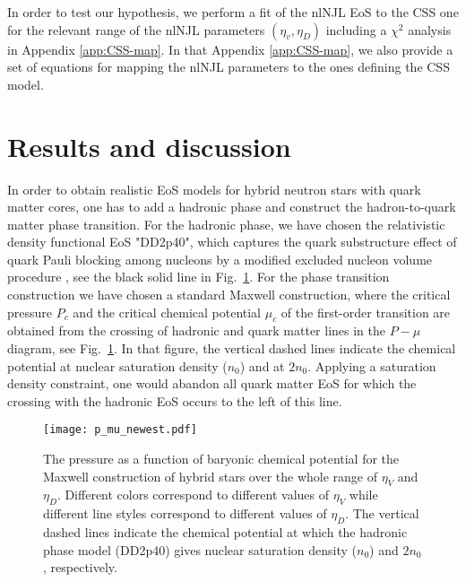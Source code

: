 \documentclass[%
 reprint,
superscriptaddress,
nofootinbib,
 amsmath,amssymb,
 aps,
]{revtex4-1}
\begin{document}
In order to test our hypothesis, we perform a fit of the nlNJL EoS to the CSS one for the relevant range of the nlNJL parameters $(\eta_v,\eta_D)$ including a $\chi^2$ analysis
in Appendix \ref{app:CSS-map}.
In that Appendix \ref{app:CSS-map}, we also provide a set of equations for mapping the nlNJL parameters to the ones defining the CSS model.


\section{Results and discussion}
\label{sec:Results}


In order to obtain realistic EoS models for hybrid neutron stars with quark matter cores, one has to add
a hadronic phase and construct the hadron-to-quark matter phase transition.
For the hadronic phase, we have chosen the relativistic density functional EoS "DD2p40", which captures the quark substructure effect of quark Pauli blocking among nucleons 
\cite{Blaschke:2020qrs} by a modified excluded nucleon volume procedure \cite{Typel:2016srf}, see the black solid line in Fig.~\ref{fig:p-mu}. 
For the phase transition construction we have chosen a standard Maxwell construction, where the critical pressure $P_c$ and the critical chemical potential $\mu_c$ of the first-order transition are obtained from the crossing of hadronic and quark matter lines in the  $P-\mu$ diagram, see Fig.~\ref{fig:p-mu}.
In that figure,  the vertical dashed lines indicate the chemical potential at nuclear saturation density ($n_0$) and at $2 n_0$. 
Applying a saturation density constraint, one would abandon all quark matter EoS for which the crossing with the hadronic EoS occurs to the left of this line.


\begin{figure}[thb]
    \texttt{[image: p\_mu\_newest.pdf]}
    \caption{The pressure as a function of baryonic chemical potential for the Maxwell construction of hybrid stars over the whole range of $\eta_V$ and $\eta_D$. %
    Different colors correspond to different values of $\eta_V$ while different line styles correspond to different values of $\eta_D$.
    {The vertical dashed lines indicate the chemical potential at which the hadronic phase model (DD2p40) gives nuclear saturation density ($n_0$) and $2 n_0$}, respectively.}
    \label{fig:p-mu}
\end{figure}
\end{document}
